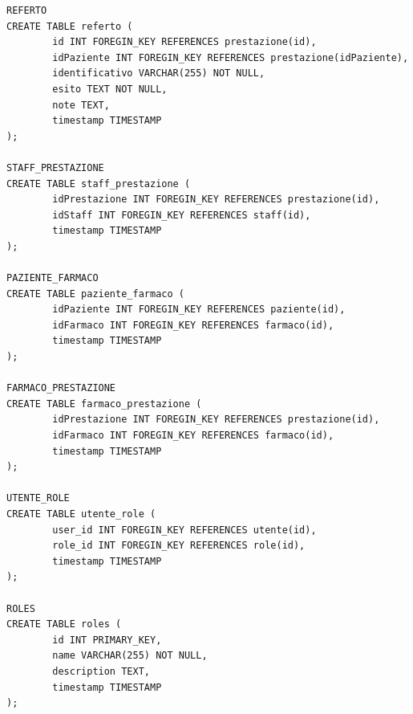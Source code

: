 \documentclass[paper=a4, fontsize=11pt,x11names]{report}
\begin{document}
\begin{verbatim}
REFERTO
CREATE TABLE referto (
        id INT FOREGIN_KEY REFERENCES prestazione(id),
        idPaziente INT FOREGIN_KEY REFERENCES prestazione(idPaziente),
        identificativo VARCHAR(255) NOT NULL,
        esito TEXT NOT NULL,
        note TEXT,
        timestamp TIMESTAMP
);

STAFF_PRESTAZIONE
CREATE TABLE staff_prestazione (
        idPrestazione INT FOREGIN_KEY REFERENCES prestazione(id),
        idStaff INT FOREGIN_KEY REFERENCES staff(id),
        timestamp TIMESTAMP
);

PAZIENTE_FARMACO
CREATE TABLE paziente_farmaco (
        idPaziente INT FOREGIN_KEY REFERENCES paziente(id),
        idFarmaco INT FOREGIN_KEY REFERENCES farmaco(id),
        timestamp TIMESTAMP
);

FARMACO_PRESTAZIONE
CREATE TABLE farmaco_prestazione (
        idPrestazione INT FOREGIN_KEY REFERENCES prestazione(id),
        idFarmaco INT FOREGIN_KEY REFERENCES farmaco(id),
        timestamp TIMESTAMP
);

UTENTE_ROLE
CREATE TABLE utente_role (
        user_id INT FOREGIN_KEY REFERENCES utente(id),
        role_id INT FOREGIN_KEY REFERENCES role(id),
        timestamp TIMESTAMP
);

ROLES
CREATE TABLE roles (
        id INT PRIMARY_KEY,
        name VARCHAR(255) NOT NULL,
        description TEXT,
        timestamp TIMESTAMP
);
\end{verbatim}

\end{document}
